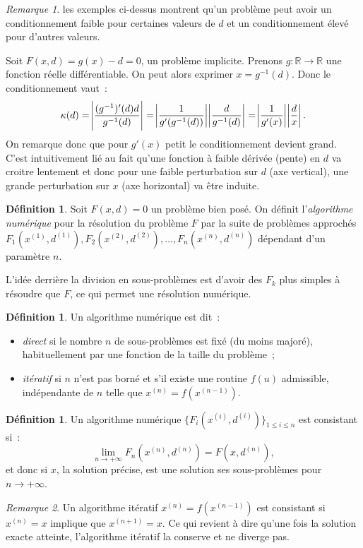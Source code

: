 \documentclass{article}
\theoremstyle{definition}
\newtheorem{déf}[thm]{Définition}
\theoremstyle{remark}
\newtheorem*{rmq}{Remarque}
\newcommand{\R}{\mathbb R}
\newcommand{\algonum}[3]{F_{#1}(#2^{(#1)}, #3^{(#1)})}
\newcommand{\algnum}{\algonum nxd}
\begin{document}
	\begin{rmq} les exemples ci-dessus montrent qu'un problème peut avoir un conditionnement faible pour certaines valeurs de $d$ et un conditionnement élevé
	pour d'autres valeurs.
	\end{rmq}

	Soit $F(x, d) = g(x) - d = 0$, un problème implicite. Prenons $g : \R \to \R$ une fonction réelle différentiable. On peut alors exprimer $x = g^{-1}(d)$.
	Donc le conditionnement vaut~:
	\[\kappa(d) = \abs {\frac {(g^{-1})'(d)d}{g^{-1}(d)}} = \abs {\frac 1{g'(g^{-1}(d))}}\abs{\frac d{g^{-1}(d)}} = \abs {\frac 1{g'(x)}}\abs{\frac dx}.\]
	On remarque donc que pour $g'(x)$ petit le conditionnement devient grand. C'est intuitivement lié au fait qu'une fonction à faible dérivée (pente) en $d$
	va croitre lentement et donc pour une faible perturbation sur $d$ (axe vertical), une grande perturbation sur $x$ (axe horizontal) va être induite.

	\begin{déf} Soit $F(x, d) = 0$ un problème bien posé. On définit l'\emph{algorithme numérique} pour la résolution du problème $F$ par la suite de problèmes
	approchés $\algonum 1xd, \algonum 2xd, \dotsc, \algnum$ dépendant d'un paramètre $n$.
	\end{déf}

	L'idée derrière la division en sous-problèmes est d'avoir des $F_k$ plus simples à résoudre que $F$, ce qui permet une résolution numérique.

	\begin{déf} Un algorithme numérique est dit~:
	\begin{itemize}
		\item \emph{direct} si le nombre $n$ de sous-problèmes est fixé (du moins majoré), habituellement par une fonction de la taille du problème~;
		\item \emph{itératif} si $n$ n'est pas borné et s'il existe une routine $f(u)$ admissible, indépendante de $n$ telle que $x^{(n)} = f(x^{(n-1)})$.
	\end{itemize}
	\end{déf}

	\begin{déf} Un algorithme numérique $\{\algonum ixd\}_{1 \leq i \leq n}$ est consistant si~:
	\[\lim_{n \to +\infty}\algnum = F(x, d^{(n)}),\]
	et donc si $x$, la solution précise, est une solution ses sous-problèmes pour $n \to +\infty$.
	\end{déf}

	\begin{rmq} Un algorithme itératif $x^{(n)} = f(x^{(n-1)})$ est consistant si $x^{(n)} = x$ implique que $x^{(n+1)} = x$. Ce qui revient à dire qu'une fois
	la solution exacte atteinte, l'algorithme itératif la conserve et ne diverge pas.
	\end{rmq}
\end{document}
